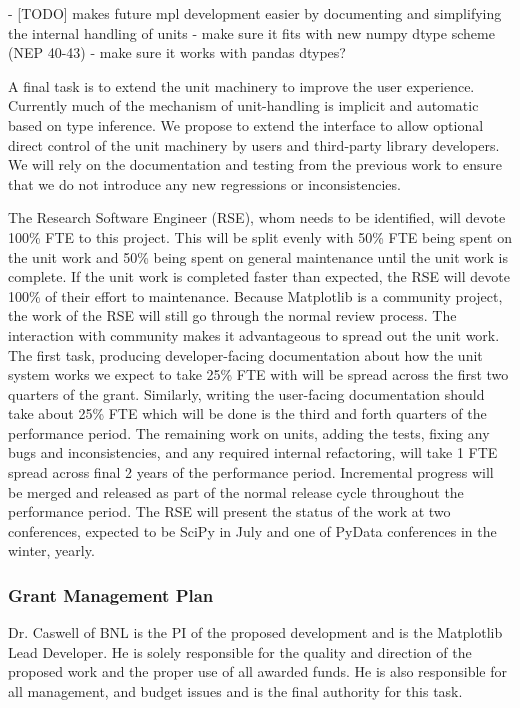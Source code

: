 \documentclass[12pt]{article}
\numberwithin{page}{section}
\begin{document}
- [TODO] makes future mpl development easier by documenting and simplifying
  the internal handling of units
- make sure it fits with new numpy dtype scheme (NEP 40-43)
- make sure it works with pandas dtypes?

A final task is to extend the unit machinery to improve the user
experience.  Currently much of the mechanism of unit-handling is
implicit and automatic based on type inference.  We propose to extend
the interface to allow optional direct control of the unit machinery
by users and third-party library developers.  We will rely on the
documentation and testing from the previous work to ensure that we do
not introduce any new regressions or inconsistencies.



The Research Software Engineer (RSE), whom needs to be identified,
will devote 100\% FTE to this project.  This will be split evenly with
50\% FTE being spent on the unit work and 50\% being spent on general
maintenance until the unit work is complete.  If the unit work is
completed faster than expected, the RSE will devote 100\% of their
effort to maintenance.  Because Matplotlib is a community project, the
work of the RSE will still go through the normal review process.  The
interaction with community makes it advantageous to spread out the
unit work.  The first task, producing developer-facing documentation
about how the unit system works we expect to take 25\% FTE with will
be spread across the first two quarters of the grant.  Similarly,
writing the user-facing documentation should take about 25\% FTE which
will be done is the third and forth quarters of the performance
period.  The remaining work on units, adding the tests, fixing any
bugs and inconsistencies, and any required internal refactoring, will
take 1 FTE spread across final 2 years of the performance period.
Incremental progress will be merged and released as part of the normal
release cycle throughout the performance period.  The RSE will present
the status of the work at two conferences, expected to be SciPy in
July and one of PyData conferences in the winter, yearly.




\subsubsection{Grant Management Plan}

Dr. Caswell of BNL is the PI of the proposed development and is the
Matplotlib Lead Developer.  He is solely responsible for the quality
and direction of the proposed work and the proper use of all awarded
funds.  He is also responsible for all management, and budget issues
and is the final authority for this task.
\end{document}
